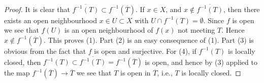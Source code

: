 \documentclass[10pt,a4paper]{amsart}
\theoremstyle{plain}
\theoremstyle{definition}
\theoremstyle{remark}
\numberwithin{equation}{subsection}
\begin{document}
\begin{proof}
It is clear that $\overline{f^{-1}(T)} \subset f^{-1}(\overline{T})$.
If $x \in X$, and $x \not \in \overline{f^{-1}(T)}$, then there
exists an open neighbourhood $x \in U \subset X$ with
$U \cap f^{-1}(T) = \emptyset$. Since $f$ is open we see that
$f(U)$ is an open neighbourhood of $f(x)$ not meeting $T$.
Hence $x \not \in f^{-1}(\overline{T})$. This proves (1).
Part (2) is an easy consequence of (1).
Part (3) is obvious from the fact that $f$ is open and surjective.
For (4), if $f^{-1}(T)$ is locally closed, then
$f^{-1}(T) \subset \overline{f^{-1}(T)} = f^{-1}(\overline{T})$
is open, and hence by (3) applied to the map
$f^{-1}(\overline{T}) \to \overline{T}$ we see that
$T$ is open in $\overline{T}$, i.e., $T$ is locally closed.
\end{proof}
\end{document}
